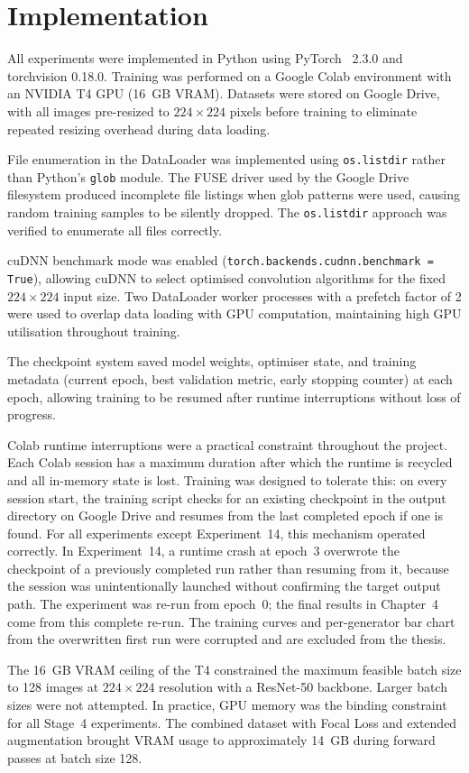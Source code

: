 
\section{Implementation}
\label{sec:implementation}

All experiments were implemented in Python using PyTorch~\cite{paszke2019pytorch} 2.3.0 and torchvision 0.18.0. Training
was performed on a Google Colab environment with an NVIDIA T4 GPU (16~GB VRAM). Datasets were
stored on Google Drive, with all images pre-resized to $224 \times 224$ pixels before training
to eliminate repeated resizing overhead during data loading.

File enumeration in the DataLoader was implemented using \texttt{os.listdir} rather than
Python's \texttt{glob} module. The FUSE driver used by the Google Drive filesystem produced
incomplete file listings when glob patterns were used, causing random training samples to be
silently dropped. The \texttt{os.listdir} approach was verified to enumerate all files
correctly.

cuDNN benchmark mode was enabled (\texttt{torch.backends.cudnn.benchmark = True}), allowing
cuDNN to select optimised convolution algorithms for the fixed $224 \times 224$ input size.
Two DataLoader worker processes with a prefetch factor of 2 were used to overlap data loading
with GPU computation, maintaining high GPU utilisation throughout training.

The checkpoint system saved model weights, optimiser state, and training metadata (current
epoch, best validation metric, early stopping counter) at each epoch, allowing training to be
resumed after runtime interruptions without loss of progress.

Colab runtime interruptions were a practical constraint throughout the project. Each Colab
session has a maximum duration after which the runtime is recycled and all in-memory state
is lost. Training was designed to tolerate this: on every session start, the training script
checks for an existing checkpoint in the output directory on Google Drive and resumes from
the last completed epoch if one is found. For all experiments except Experiment~14, this
mechanism operated correctly. In Experiment~14, a runtime crash at epoch~3 overwrote the
checkpoint of a previously completed run rather than resuming from it, because the session
was unintentionally launched without confirming the target output path. The experiment was
re-run from epoch~0; the final results in Chapter~4 come from this complete re-run. The
training curves and per-generator bar chart from the overwritten first run were corrupted
and are excluded from the thesis.

The 16~GB VRAM ceiling of the T4 constrained the maximum feasible batch size to 128 images
at $224\times224$ resolution with a ResNet-50 backbone. Larger batch sizes were not
attempted. In practice, GPU memory was the binding constraint for all Stage~4 experiments.
The combined dataset with Focal Loss and extended augmentation brought VRAM usage to
approximately 14~GB during forward passes at batch size 128.